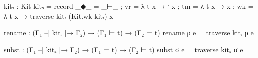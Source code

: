 \begin{frame}
\begin{code}
kitₛ : Kit
kitₛ = record {  _◆_  = _⊢_
              ;  vr   = λ t x → ` x
              ;  tm   = λ t x → x
              ;  wk   = λ t x → traverse kitᵣ (Kit.wk kitᵣ) x
              }
\end{code}
\end{frame}

\begin{frame}
\begin{code}
rename : (Γ₁ –[ kitᵣ ]→ Γ₂) → (Γ₁ ⊢ t) → (Γ₂ ⊢ t)
rename ρ e = traverse kitᵣ ρ e

subst : (Γ₁ –[ kitₛ ]→ Γ₂) → (Γ₁ ⊢ t) → (Γ₂ ⊢ t)
subst σ e = traverse kitₛ σ e
\end{code}
\end{frame}
